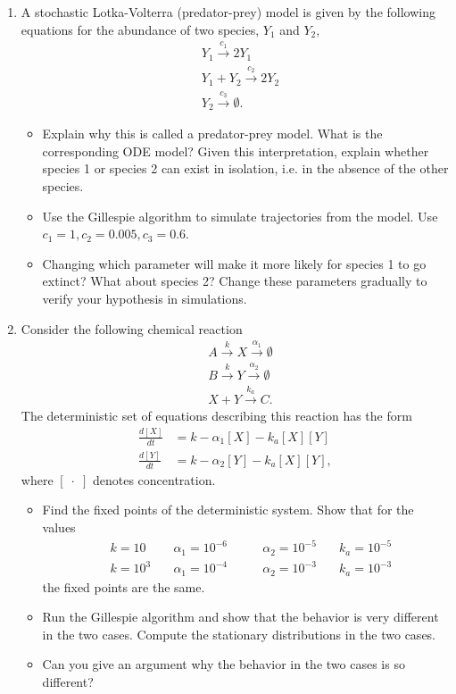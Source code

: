 \documentclass[12pt]{article}
\newcommand{\stc}{\stackrel}
\begin{document}
\begin{enumerate}
\item  A stochastic Lotka-Volterra (predator-prey) model is given by the following equations for the abundance of
two species, $Y_1$ and $Y_2$,
\begin{align*}
&Y_1 \stc{c_1}{\longrightarrow} 2 Y_1 \\
&Y_1 + Y_2 \stc{c_2}{\longrightarrow} 2 Y_2  \\
& Y_2 \stc{c_3}{\longrightarrow} \emptyset.
\end{align*}
\begin{itemize}
\item Explain why this is called a predator-prey model.  What is the corresponding ODE model? 
Given this interpretation, explain whether species 1 or species 2 can exist in isolation, i.e. in the 
absence of the other species.
\item Use the Gillespie algorithm to simulate trajectories from the model. Use
$c_1 = 1, c_2 = 0.005, c_3 = 0.6$.
\item Changing which parameter will make it more likely for species 1 to go extinct?  What about species 2?
Change these parameters gradually to verify your hypothesis in simulations.
\end{itemize}



\item Consider the following chemical reaction
\begin{align*}
&A \stc{k}{\longrightarrow} X \stc{\alpha_1}{\longrightarrow} \emptyset\\
&B \stc{k}{\longrightarrow} Y \stc{\alpha_2}{\longrightarrow}  \emptyset \\
& X + Y \stc{k_a}{\longrightarrow} C.
\end{align*}
The deterministic set of equations describing this reaction has the form
\begin{align*}
\frac{d [X]}{dt} &= k - \alpha_1 [X] - k_a [X] [Y] \\
\frac{d [Y]}{dt} &= k - \alpha_2 [Y] - k_a[X] [Y] ,
\end{align*}
where $[\;\cdot\;]$ denotes concentration.
\begin{itemize}
\item Find the fixed points of the deterministic system.  Show that for 
the values
\begin{align*}
& k = 10 \quad & \alpha_1 = 10^{-6} \qquad & \alpha_2 = 10^{-5} \quad & k_a = 10^{-5}  \\
& k = 10^3 \quad & \alpha_1 = 10^{-4} \qquad & \alpha_2 = 10^{-3} \quad & k_a = 10^{-3}
\end{align*}
the fixed points are the same.
\item Run the Gillespie algorithm and show that the behavior is very different in the two cases.
Compute the stationary distributions in the two cases.
\item Can you give an argument why the behavior in the two cases is so different?
\end{itemize}


\end{enumerate}
\end{document}
